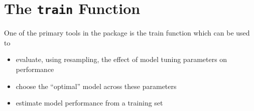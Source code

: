 \section{The \texttt{train} Function}
One of the primary tools in the package is the train function which can be used to

\begin{itemize}
\item evaluate, using resampling, the eﬀect of model tuning parameters on performance
\item choose the “optimal” model across these parameters
\item estimate model performance from a training set
\end{itemize}


